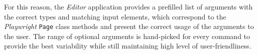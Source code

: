For this reason, the \textit{Editor} application provides a prefilled list of arguments with the correct types and matching input elements,
which correspond to the \textit{Playwright} \texttt{Page} class methods and present the correct usage of the arguments to the user.
The range of optional arguments is hand-picked for every command to provide the best variability while still maintaining high level of user-friendliness.

\subsubsection{}
